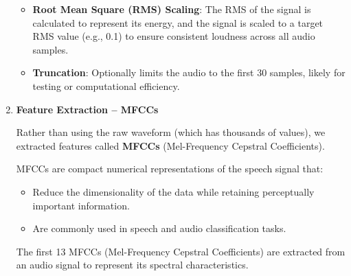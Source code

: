 \documentclass[informe,english]{practicaitic}
\begin{document}
\begin{enumerate}
\begin{itemize}
        \item \textbf{Root Mean Square (RMS) Scaling}: The RMS of the signal is calculated to represent its energy, and the signal is scaled to a target RMS value (e.g., 0.1) to ensure consistent loudness across all audio samples.
        
        \item \textbf{Truncation}: Optionally limits the audio to the first 30 samples, likely for testing or computational efficiency.
    \end{itemize}
    
    \item \textbf{Feature Extraction – MFCCs}

    Rather than using the raw waveform (which has thousands of values), we extracted features called \textbf{MFCCs} (Mel-Frequency Cepstral Coefficients).
    
    MFCCs are compact numerical representations of the speech signal that:
    \begin{itemize}
        \item Reduce the dimensionality of the data while retaining perceptually important information. 
        \item Are commonly used in speech and audio classification tasks.
    \end{itemize}
    
    The first 13 MFCCs (Mel-Frequency Cepstral Coefficients) are extracted from an audio signal to represent its spectral characteristics. 
    

\end{enumerate}
\end{document}
